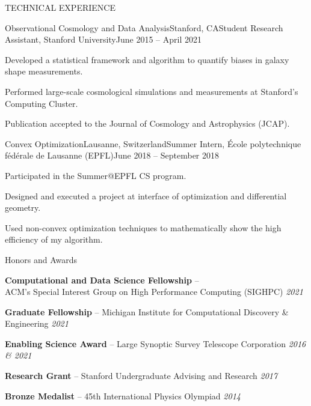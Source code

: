 \documentclass{resume} %
\begin{document}
\begin{rSection}{TECHNICAL EXPERIENCE}
\begin{rSubsection}{Observational Cosmology and Data Analysis}{Stanford, CA}{Student Research Assistant, Stanford University}{June 2015 -- April 2021}

\item Developed a statistical framework and algorithm to quantify biases in galaxy shape measurements.
\item Performed large-scale cosmological simulations and measurements at Stanford's Computing Cluster.
\item Publication accepted to the Journal of Cosmology and Astrophysics (JCAP). 
\end{rSubsection}

\begin{rSubsection}{Convex Optimization}{Lausanne, Switzerland}{Summer Intern, \'Ecole polytechnique f\'ed\'erale de Lausanne (EPFL)}{June 2018 -- September 2018}
\item Participated in the Summer@EPFL CS program. 
\item Designed and executed a project at interface of optimization and differential geometry. 
\item Used non-convex optimization techniques to mathematically show the high efficiency of my algorithm.
\end{rSubsection}

\end{rSection}



\begin{rSection}{Honors and Awards} \itemsep -3pt \vspace*{-.25cm}

\item \textbf{Computational and Data Science Fellowship} -- \\ ACM’s Special Interest Group on High Performance Computing (SIGHPC) \hfill {\em 2021}

\item \textbf{Graduate Fellowship} -- Michigan Institute for Computational Discovery \& Engineering  \hfill {\em 2021}

\item \textbf{Enabling Science Award} -- Large Synoptic Survey Telescope Corporation \hfill {\em 2016 \& 2021}

\item \textbf{Research Grant} -- Stanford Undergraduate Advising and Research \hfill {\em 2017}

\item \textbf{Bronze Medalist} -- 45th International Physics Olympiad \hfill {\em 2014}
\end{rSection}
\end{document}
